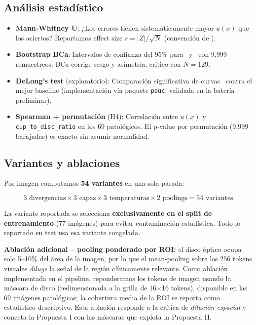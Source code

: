 \documentclass[12pt,a4paper]{article}
\newcommand{\AUROC}{\mathrm{AUROC}}
\newcommand{\AUPRC}{\mathrm{AUPRC}}
\begin{document}
\subsection{Análisis estadístico}

\begin{itemize}[leftmargin=2em]
    \item \textbf{Mann-Whitney U}: ¿Los errores tienen sistemáticamente mayor $u(x)$ que los aciertos?
    Reportamos effect size $r = |Z| / \sqrt{N}$ (convención de \citet{fritz2012effect}).

    \item \textbf{Bootstrap BCa}: Intervalos de confianza del 95\% para \AUROC\ y \AUPRC\ con 9,999 remuestreos.
    BCa corrige sesgo y asimetría, crítico con $N=129$.

    \item \textbf{DeLong's test} (exploratorio): Comparación significativa de curvas \AUROC\ contra el mejor baseline (implementación vía paquete \texttt{pauc}, validada en la batería preliminar).

    \item \textbf{Spearman + permutación} (H4): Correlación entre $u(x)$ y \texttt{cup\_to\_disc\_ratio} en los 69 patológicos.
    El p-value por permutación (9,999 barajadas) es exacto sin asumir normalidad.
\end{itemize}

\subsection{Variantes y ablaciones}

Por imagen computamos \textbf{54 variantes} en una sola pasada:

\begin{equation}
3 \text{ divergencias} \times 3 \text{ capas} \times 3 \text{ temperaturas} \times 2 \text{ poolings} = 54 \text{ variantes}
\end{equation}

La variante reportada se selecciona \textbf{exclusivamente en el split de entrenamiento} (77 imágenes) para evitar contaminación estadística.
Todo lo reportado en test usa esa variante congelada.

\textbf{Ablación adicional -- pooling ponderado por ROI:} el disco óptico ocupa solo 5--10\% del área de la imagen, por lo que el mean-pooling sobre los 256 tokens visuales \emph{diluye} la señal de la región clínicamente relevante.
Como ablación implementada en el pipeline, reponderamos los tokens de imagen usando la máscara de disco (redimensionada a la grilla de 16$\times$16 tokens), disponible en las 69 imágenes patológicas; la cobertura media de la ROI se reporta como estadístico descriptivo.
Esta ablación responde a la crítica de \emph{dilución espacial} y conecta la Propuesta I con las máscaras que explota la Propuesta II.
\end{document}
